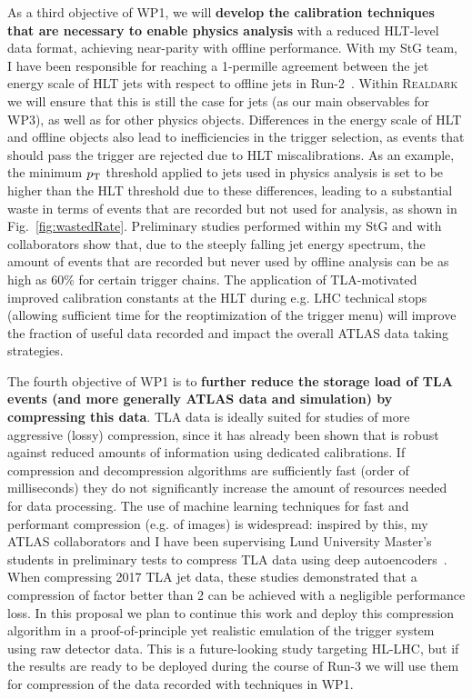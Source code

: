 As a third objective of WP1, we will \textbf{develop the calibration techniques that are necessary to enable physics analysis} with a reduced HLT-level data format, achieving near-parity with offline performance. 
With my StG team, I have been responsible for reaching a 1-permille agreement between the jet energy scale of HLT jets with respect to offline jets in Run-2~\cite{ToBeCited}.%
Within \textsc{Realdark} we will ensure that this is still the case for jets (as our main observables for WP3), as well as for other physics objects. 
Differences in the energy scale of HLT and offline objects also lead to inefficiencies in the trigger selection, as events that should pass the trigger are rejected due to HLT miscalibrations. 
As an example, the minimum $p_{\rm{T}}$ threshold applied to jets used in physics analysis is set to be higher than the HLT threshold due to these differences, leading to a substantial waste in terms of events that are recorded but not used for analysis, as shown in Fig.~\ref{fig:wastedRate}. 
Preliminary studies performed within my StG and with collaborators show that, due to the steeply falling jet energy spectrum, the amount of events that are recorded but never used by offline analysis can be as high as 60\% for certain trigger chains. 
The application of TLA-motivated improved calibration constants at the HLT during e.g. LHC technical stops (allowing sufficient time for the reoptimization of the trigger menu) will improve the fraction of useful data recorded and impact the overall ATLAS data taking strategies. 

The fourth objective of WP1 is to \textbf{further reduce the storage load of TLA events (and more generally ATLAS data and simulation) by compressing this data}. 
TLA data is ideally suited for studies of more aggressive (lossy) compression, since it has already been shown that is robust against reduced amounts of information using dedicated calibrations. If compression and decompression algorithms are sufficiently fast (order of milliseconds) they do not significantly increase the amount of resources needed for data processing. 
The use of machine learning techniques for fast and performant compression (e.g. of images) is widespread: inspired by this, my ATLAS collaborators and I have been supervising Lund University Master’s students in preliminary tests to compress TLA data using deep autoencoders~\cite{ToBeCited}. %
When compressing 2017 TLA jet data, these studies demonstrated that a compression of factor better than 2 can be achieved with a negligible performance loss.  
In this proposal we plan to continue this work and deploy this compression algorithm in a proof-of-principle yet realistic emulation of the trigger system using raw detector data. This is a future-looking study targeting HL-LHC, but if the results are ready to be deployed during the course of Run-3 we will use them for compression of the data recorded with techniques in WP1. 

